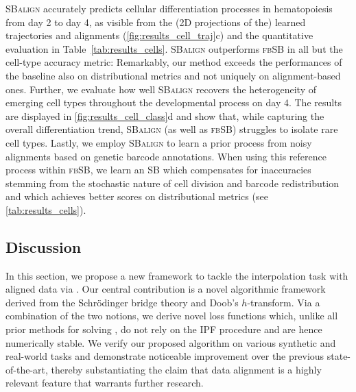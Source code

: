 \textsc{SBalign} accurately predicts cellular differentiation processes in hematopoiesis from day 2 to day 4, as visible from the (2D projections of the) learned trajectories and alignments (\cref{fig:results_cell_traj}c) and the quantitative evaluation in Table~\ref{tab:results_cells}. \textsc{SBalign} outperforms \textsc{fbSB} in all but the cell-type accuracy metric: Remarkably, our method exceeds the performances of the baseline also on distributional metrics and not uniquely on alignment-based ones. Further, we evaluate how well \textsc{SBalign} recovers the heterogeneity of emerging cell types throughout the developmental process on day 4. The results are displayed in \cref{fig:results_cell_class}d and show that, while capturing the overall differentiation trend, \textsc{SBalign} (as well as \textsc{fbSB}) struggles to isolate rare cell types.
Lastly, we employ \textsc{SBalign} to learn a prior process from noisy alignments based on genetic barcode annotations. When using this reference process within \textsc{fbSB}, we learn an SB which compensates for inaccuracies stemming from the stochastic nature of cell division and barcode redistribution and which achieves better scores on distributional metrics (see \cref{tab:results_cells}).

\subsection{Discussion}

In this section, we propose a new framework to tackle the interpolation task with aligned data via . Our central contribution is a novel algorithmic framework derived from the Schr{\"o}dinger bridge theory and Doob's $h$-transform. Via a combination of the two notions, we derive novel loss functions which, unlike all prior methods for solving , do not rely on the \acrlong{IPF} procedure and are hence numerically stable. We verify our proposed algorithm on various synthetic and real-world tasks and demonstrate noticeable improvement over the previous state-of-the-art, thereby substantiating the claim that data alignment is a highly relevant feature that warrants further research.
